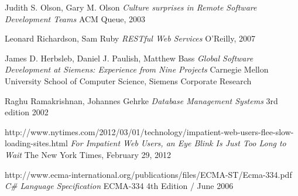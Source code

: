 \begin{thebibliography}{9}

		Judith S. Olson, Gary M. Olson\newline
		\emph{Culture surprises in Remote Software Development Teams}\newline
		ACM Queue, 2003

		Leonard Richardson, Sam Ruby\newline
		\emph{RESTful Web Services}
		O'Reilly, 2007
    
		James D. Herbsleb, Daniel J. Paulish, Matthew Bass\newline
		\emph{Global Software Development at Siemens: Experience from Nine Projects}
		Carnegie Mellon University School of Computer Science,
		Siemens Corporate Research 
	
		Raghu Ramakrishnan, Johannes Gehrke\newline
		\emph{Database Management Systems}\newline
		3rd edition 2002

		http://www.nytimes.com/2012/03/01/technology/impatient-web-users-flee-slow-loading-sites.html\newline
		\emph{For Impatient Web Users, an Eye Blink Is Just Too Long to Wait}\newline
		The New York Times, February 29, 2012

		http://www.ecma-international.org/publications/files/ECMA-ST/Ecma-334.pdf\newline
		\emph{C\# Language Specification }\newline
		ECMA-334 4th Edition / June 2006

\end{thebibliography}
